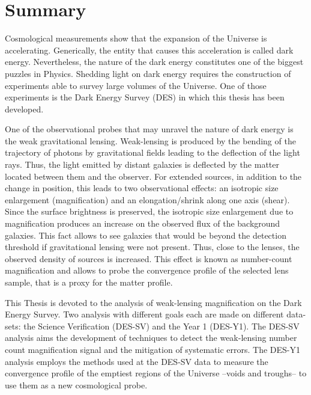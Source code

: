 \chapter*{Summary}
Cosmological measurements show that the expansion of the Universe is accelerating. Generically, the entity that causes this acceleration is called dark energy. Nevertheless, the nature of the dark energy constitutes one of the biggest puzzles in Physics. Shedding light on dark energy requires the construction of experiments able to survey large volumes of the Universe. One of those experiments is the Dark Energy Survey (DES) in which this thesis has been developed.
\newline

One of the observational probes that may unravel the nature of dark energy is the weak gravitational lensing. Weak-lensing is produced by the bending of the trajectory of photons by gravitational fields leading to the deflection of the light rays. Thus, the light emitted by distant galaxies is deflected by the matter located between them and the observer. For extended sources, in addition to the change in position, this leads to two observational effects: an isotropic size enlargement (magnification) and an elongation/shrink along one axis (shear). Since the surface brightness is preserved, the isotropic size enlargement due to magnification produces an increase on the observed flux of the background galaxies. This fact allows to see galaxies that would be beyond the detection threshold if gravitational lensing were not present. Thus, close to the lenses, the observed density of sources is increased. This effect is known as number-count magnification and allows to probe the convergence profile of the selected lens sample, that is a proxy for the matter profile.
\newline

This Thesis is devoted to the analysis of weak-lensing magnification on the Dark Energy Survey. Two analysis with different goals each are made on different data-sets: the Science Verification (DES-SV) and the Year 1 (DES-Y1). The DES-SV analysis aims the development of techniques to detect the weak-lensing number count magnification signal and the mitigation of systematic errors. The DES-Y1 analysis employs the methods used at the DES-SV data to measure the convergence profile of the emptiest regions of the Universe --voids and troughs-- to use them as a new cosmological probe.
